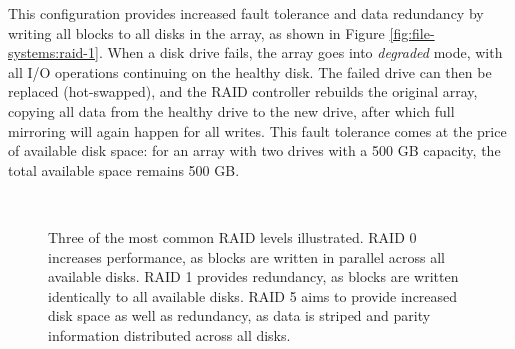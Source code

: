 This configuration provides increased fault tolerance
and data redundancy by writing all blocks to all disks
in the array, as shown in Figure
\ref{fig:file-systems:raid-1}.  When a disk drive
fails, the array goes into {\em degraded} mode, with
all I/O operations continuing on the healthy disk.
The failed drive can then be replaced
(hot-swapped),
and the RAID controller rebuilds the original array,
copying all data from the healthy drive to the new
drive, after which full mirroring will again happen
for all writes.  This fault tolerance comes at the
price of available disk space: for an array with two
drives with a 500 GB capacity, the total available
space remains 500 GB.

\begin{figure}[ht]
	\centering
	\qquad
	 \\
	\caption[RAID Levels illustrated]{Three of the most common RAID
		levels illustrated. RAID 0 increases performance, as blocks are
		written in parallel across all available disks. 
		RAID 1 provides redundancy, as blocks are written
		identically to all available disks.  RAID 5 aims to
		provide increased disk space as well as redundancy,
		as data is striped and parity information distributed
		across all disks.
		\label{fig:file-systems:raid}}
\end{figure}


